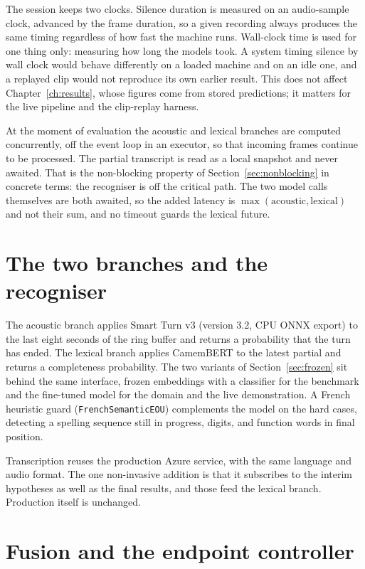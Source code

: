 The session keeps two clocks. Silence duration is
measured on an audio-sample clock, advanced by the frame duration, so a given recording
always produces the same timing regardless of how fast the machine runs. Wall-clock time is
used for one thing only: measuring how long the models took. A system timing silence by wall clock would behave differently on a loaded machine and on an
idle one, and a replayed clip would not reproduce its own earlier result. This does not
affect Chapter~\ref{ch:results}, whose figures come from stored predictions; it matters for
the live pipeline and the clip-replay harness.

At the moment of evaluation the acoustic and lexical branches are computed concurrently,
off the event loop in an executor, so that incoming frames continue to be processed. The partial transcript is read as a local snapshot and never awaited. That is the
non-blocking property of Section~\ref{sec:nonblocking} in concrete terms: the recogniser is
off the critical path. The two model calls themselves are both awaited, so the added latency
is $\max(\text{acoustic}, \text{lexical})$ and not their sum, and no timeout guards the
lexical future.

\section{The two branches and the recogniser}
\label{sec:branches}

The acoustic branch applies Smart Turn v3 (version 3.2, CPU ONNX export) to the last eight
seconds of the ring buffer and returns a probability that the turn has ended. The lexical
branch applies CamemBERT to the latest partial and returns a completeness probability. The
two variants of Section~\ref{sec:frozen} sit behind the same interface, frozen embeddings
with a classifier for the benchmark and the fine-tuned model for the domain and the live
demonstration. A French heuristic guard (\texttt{FrenchSemanticEOU}) complements the model
on the hard cases, detecting a spelling sequence still in progress, digits, and function
words in final position.

Transcription reuses the production Azure service, with the same language and audio format.
The one non-invasive addition is that it subscribes to the interim hypotheses as well as
the final results, and those feed the lexical branch. Production itself is unchanged.

\section{Fusion and the endpoint controller}
\label{sec:fusionimpl}

